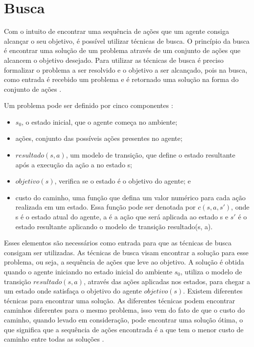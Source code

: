 \chapter{\label{chap:busca}Busca}

Com o intuito de encontrar uma sequência de ações que um agente consiga alcançar o seu objetivo, é possível utilizar técnicas de busca.
O princípio da busca é encontrar uma solução de um problema através de um conjunto de ações que alcancem o objetivo desejado. 
Para utilizar as técnicas de busca é preciso formalizar o problema a ser resolvido e o objetivo a ser alcançado, pois na busca, como entrada é recebido um problema e é retornado uma solução na forma do conjunto de ações \cite{intelligence2003modern}. 

Um problema pode ser definido por cinco componentes \cite{intelligence2003modern}: 

\begin{itemize}
	\item $s_{0}$, o estado inicial, que o agente começa no ambiente;
	\item ações, conjunto das possíveis ações presentes no agente;
	\item $resultado(s, a)$, um modelo de transição, que define o estado resultante após a execução da ação a no estado s;
	\item $objetivo(s)$, verifica se o estado é o objetivo do agente; e
	\item custo do caminho, uma função que defina um valor numérico para cada ação realizada em um estado. Essa função pode ser denotada por $c(s, a, s')$, onde s é o estado atual do agente, a é a ação que será aplicada ao estado s e $s'$ é o estado resultante aplicando o modelo de transição resultado(s, a). 
\end{itemize}   


Esses elementos são necessários como entrada para que as técnicas de busca consigam ser utilizadas. As técnicas de busca visam encontrar a solução para esse problema, ou seja, a sequência de ações que leve ao objetivo. 
A solução é obtida quando o agente iniciando no estado inicial do ambiente $s_{0}$, utiliza o modelo de transição $resultado(s, a)$, através das ações aplicadas nos estados, para chegar a um estado onde satisfaça o objetivo do agente $objetivo(s)$.
Existem diferentes técnicas para encontrar uma solução. As diferentes técnicas podem encontrar caminhos diferentes para o mesmo problema, isso vem do fato de que o custo do caminho, quando levado em consideração, pode encontrar uma solução ótima, o que significa que a sequência de ações encontrada é a que tem o menor custo de caminho entre todas as soluções \cite{intelligence2003modern}. 

